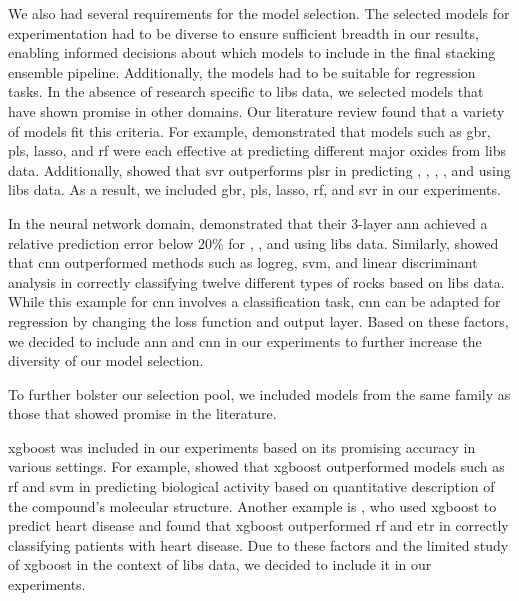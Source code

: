 We also had several requirements for the model selection.
The selected models for experimentation had to be diverse to ensure sufficient breadth in our results, enabling informed decisions about which models to include in the final stacking ensemble pipeline.
Additionally, the models had to be suitable for regression tasks. 
In the absence of research specific to \gls{libs} data, we selected models that have shown promise in other domains.
Our literature review found that a variety of models fit this criteria.
For example, \citet{andersonPostlandingMajorElement2022} demonstrated that models such as \gls{gbr}, \gls{pls}, \gls{lasso}, and \gls{rf} were each effective at predicting different major oxides from \gls{libs} data. 
Additionally, \citet{svrforlibs} showed that \gls{svr} outperforms \gls{plsr} in predicting , , , , and  using \gls{libs} data.
As a result, we included \gls{gbr}, \gls{pls}, \gls{lasso}, \gls{rf}, and \gls{svr} in our experiments.

In the neural network domain, \citet{ann_libs_soil_analysis} demonstrated that their 3-layer \gls{ann} achieved a relative prediction error below 20\% for , , and  using \gls{libs} data. 
Similarly, \citet{yangConvolutionalNeuralNetwork2022} showed that \gls{cnn} outperformed methods such as \gls{logreg}, \gls{svm}, and linear discriminant analysis in correctly classifying twelve different types of rocks based on \gls{libs} data.
While this example for \gls{cnn} involves a classification task, \gls{cnn} can be adapted for regression by changing the loss function and output layer.
Based on these factors, we decided to include \gls{ann} and \gls{cnn} in our experiments to further increase the diversity of our model selection.

To further bolster our selection pool, we included models from the same family as those that showed promise in the literature.

\gls{xgboost} was included in our experiments based on its promising accuracy in various settings.
For example, \citet{xgboost_in_biomedicie} showed that \gls{xgboost} outperformed models such as \gls{rf} and \gls{svm} in predicting biological activity based on quantitative description of the compound's molecular structure. 
Another example is \citet{xgboost_in_heart_disease}, who used \gls{xgboost} to predict heart disease and found that \gls{xgboost} outperformed \gls{rf} and \gls{etr} in correctly classifying patients with heart disease.
Due to these factors and the limited study of \gls{xgboost} in the context of \gls{libs} data, we decided to include it in our experiments.

